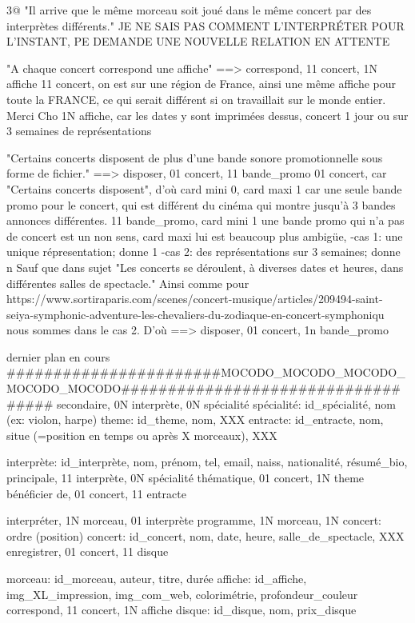 \documentclass[12pt,a4paper]{article}
\begin{document}
{3@ "Il arrive que le même morceau soit joué dans le même concert par des interprètes différents."
JE NE SAIS PAS COMMENT L'INTERPRÉTER POUR L'INSTANT, PE DEMANDE UNE NOUVELLE RELATION
EN ATTENTE



"A chaque concert correspond une affiche"
==> correspond, 11 concert, 1N affiche
11 concert, on est sur une région de France, ainsi une même affiche pour toute la FRANCE, ce qui serait différent si on travaillait sur le monde entier. Merci Cho
1N affiche, car les dates y sont imprimées dessus, concert 1 jour ou sur 3 semaines de représentations


"Certains concerts disposent de plus d'une bande sonore promotionnelle sous forme de fichier."
==> disposer, 01 concert, 11 bande_promo
01 concert, car "Certains concerts disposent", d'où card mini 0, card maxi 1 car une seule bande promo pour le concert, qui est différent du cinéma qui montre jusqu'à 3 bandes annonces différentes.
11 bande_promo, card mini 1 une bande promo qui n'a pas de concert est un non sens, card maxi lui est beaucoup plus ambigüe, 
	-cas 1: une unique répresentation; donne 1
	-cas 2: des représentations sur 3 semaines; donne n
Sauf que dans sujet "Les concerts se déroulent, à diverses dates et heures, dans différentes salles de spectacle." Ainsi comme pour https://www.sortiraparis.com/scenes/concert-musique/articles/209494-saint-seiya-symphonic-adventure-les-chevaliers-du-zodiaque-en-concert-symphoniqu
nous sommes dans le cas 2. D'où 
==> disposer, 01 concert, 1n bande_promo







dernier plan en cours
#######################MOCODO_MOCODO_MOCODO_MOCODO_MOCODO###################################
secondaire, 0N interprète, 0N spécialité
spécialité: id_spécialité, nom (ex: violon, harpe)
theme: id_theme, nom, XXX
entracte: id_entracte, nom, situe (=position en temps ou après X morceaux), XXX

interprète: id_interprète, nom, prénom, tel, email, naiss, nationalité, résumé_bio,
principale, 11 interprète, 0N spécialité
thématique, 01 concert, 1N theme
bénéficier de, 01 concert, 11 entracte

interpréter, 1N morceau, 01 interprète
programme, 1N morceau, 1N concert: ordre (position)
concert: id_concert, nom, date, heure, salle_de_spectacle, XXX
enregistrer, 01 concert, 11 disque

morceau: id_morceau, auteur, titre, durée
affiche: id_affiche, img_XL_impression, img_com_web, colorimétrie, profondeur_couleur
correspond, 11 concert, 1N affiche
disque: id_disque, nom, prix_disque

}
\end{document}
